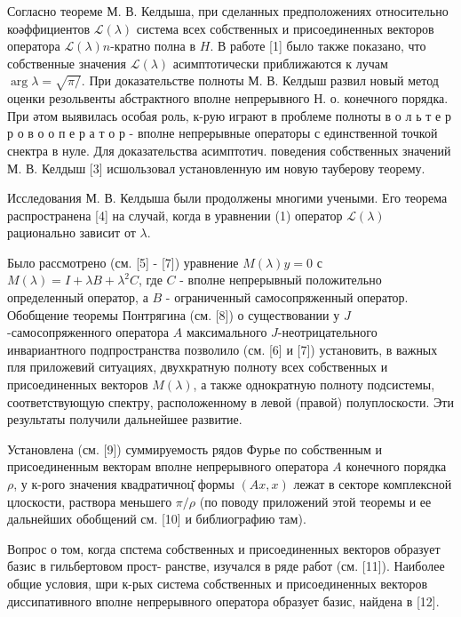 \documentclass[10pt]{article}
\begin{document}
Согласно теореме М. В. Келдыша, при сделанных предположениях относительно коәффициентов $\mathscr{L}(\lambda)$ система всех собственных и присоединенных векторов оператора $\mathscr{L}(\lambda) n$-кратно полна в $H$. В работе [1] было также показано, что собственные значения $\mathscr{L}(\lambda)$ асимптотически приближаются к лучам $\arg \lambda=\sqrt{\pi /}$. При доказательстве полноты М. В. Келдыш развил новый метод оценки резольвенты абстрактного вполне непрерывного Н. о. конечного порядка. При әтом выявилась особая роль, к-рую играют в проблеме полноты в о л ь т е р р о в о о п е р а т о р - вполне непрерывные операторы с единственной точкой снектра в нуле. Для доказательства асимптотич. поведения собственных значений М. В. Келдыш [3] исшользовал установленную им новую тауберову теорему.



Исследования М. В. Келдыша были продолжены многими учеными. Его теорема распространена [4] на случай, когда в уравнении (1) оператор $\mathscr{L}(\lambda)$ рационально зависит от $\lambda$.



Было рассмотрено (см. [5] - [7]) уравнение $M(\lambda) y=0$ с $M(\lambda)=I+\lambda B+\lambda^{2} C$, где $C$ - вполне непрерывный положительно определенный оператор, а $B$ - ограниченный самосопряженный оператор. Обобщение теоремы Понтрягина (см. [8]) о существовании у $J$-самосопряженного оператора $A$ максимального $J$-неотрицательного инвариантного подпространства позволило (см. [6] и [7]) установить, в важных пля приложевий ситуациях, двухкратную полноту всех собственных и присоединенных векторов $M(\lambda)$, а также однократную полноту подсистемы, соответствующую спектру, расположенному в левой (правой) полуплоскости. Эти результаты получили дальнейшее развитие.



Установлена (см. [9]) суммируемость рядов Фурье по собственным и присоединенным векторам вполне непрерывного оператора $A$ конечного порядка $\rho$, у к-рого значения квадратичноц̆ формы $(A x, x)$ лежат в секторе комплексной цлоскости, раствора меньшего $\pi / \rho$ (по поводу приложений этой теоремы и ее дальнейших обобщений см. [10] и библиографию там).



Вопрос о том, когда спстема собственных и присоединенных векторов образует базис в гильбертовом прост- ранстве, изучался в ряде работ (см. [11]). Наиболее общие условия, шри к-рых система собственных и присоединенных векторов диссипативного вполне непрерывного оператора образует базис, найдена в [12].
\end{document}
